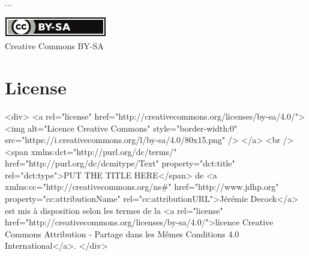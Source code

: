 \documentclass{article}
\begin{document}
...







\ifpdf
    \vfill %
    \begin{center}
        \href{http://creativecommons.org/licenses/by-sa/4.0/}{\includegraphics[width=.15\linewidth]{fig/cc_by_sa_small}}\\
        \small{Creative Commons BY-SA}
    \end{center}
\else
    \section*{License}\label{sec:license}
 
    \begin{rawhtml}

        <div>
            <a rel="license" href="http://creativecommons.org/licenses/by-sa/4.0/">
                <img alt="Licence Creative Commons" style="border-width:0" src="https://i.creativecommons.org/l/by-sa/4.0/80x15.png" />
            </a>
            <br />
            <span xmlns:dct="http://purl.org/dc/terms/" href="http://purl.org/dc/dcmitype/Text" property="dct:title" rel="dct:type">PUT THE TITLE HERE</span> de <a xmlns:cc="http://creativecommons.org/ns#" href="http://www.jdhp.org" property="cc:attributionName" rel="cc:attributionURL">Jérémie Decock</a> est mis à disposition selon les termes de la <a rel="license" href="http://creativecommons.org/licenses/by-sa/4.0/">licence Creative Commons Attribution -  Partage dans les Mêmes Conditions 4.0 International</a>.
        </div>

    \end{rawhtml}
\fi
\end{document}
